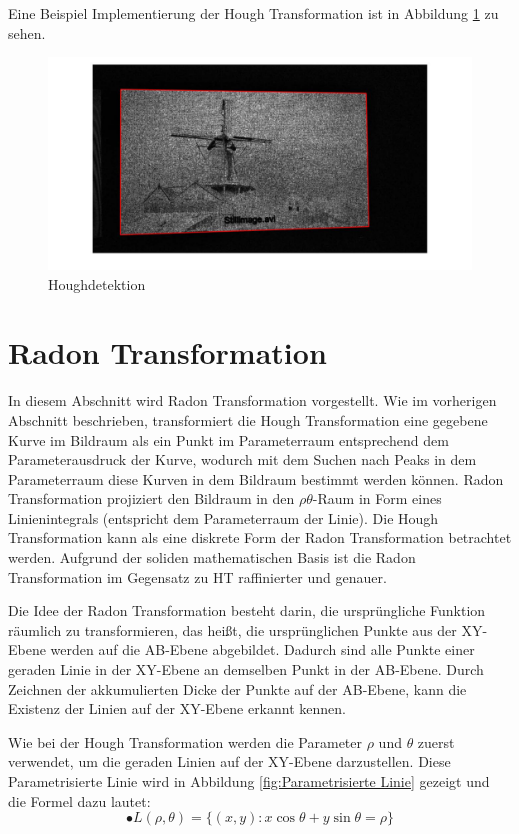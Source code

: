 Eine Beispiel Implementierung der Hough Transformation ist in Abbildung \ref{fig:Houghdetektion} zu sehen.

\begin{figure}[H]
 \centering 
  \includegraphics[keepaspectratio,width=1.0\textwidth]{images/4_ZweiteErfahrung/Hough/Houghdetektion.pdf}
 \caption{Houghdetektion}
 \label{fig:Houghdetektion}
\end{figure}

\section{Radon Transformation}
In diesem Abschnitt wird Radon Transformation vorgestellt. Wie im vorherigen Abschnitt beschrieben, transformiert die Hough Transformation eine gegebene Kurve im Bildraum als ein Punkt im Parameterraum entsprechend dem Parameterausdruck der Kurve, wodurch mit dem Suchen nach Peaks in dem Parameterraum diese Kurven in dem Bildraum bestimmt werden können. Radon Transformation projiziert den Bildraum in den $ \rho \theta $-Raum in Form eines Linienintegrals (entspricht dem Parameterraum der Linie). Die Hough Transformation kann als eine diskrete Form der Radon Transformation betrachtet werden. Aufgrund der soliden mathematischen Basis ist die Radon Transformation im Gegensatz zu HT raffinierter und genauer.

Die Idee der Radon Transformation besteht darin, die ursprüngliche Funktion räumlich zu transformieren, das heißt, die ursprünglichen Punkte aus der XY-Ebene werden auf die AB-Ebene abgebildet. Dadurch sind alle Punkte einer geraden Linie in der XY-Ebene an demselben Punkt in der AB-Ebene. Durch Zeichnen der akkumulierten Dicke der Punkte auf der AB-Ebene, kann die Existenz der Linien auf der XY-Ebene erkannt kennen.

Wie bei der Hough Transformation werden die Parameter $ \rho $ und $ \theta $ zuerst verwendet, um die geraden Linien auf der XY-Ebene darzustellen. Diese Parametrisierte Linie wird in Abbildung \ref{fig:Parametrisierte Linie} gezeigt und die Formel dazu lautet:
\begin{equation}
•  L(\rho,\theta)=\lbrace(x,y):x\cos{\theta} + y\sin{\theta} = \rho\rbrace
\end{equation} 

